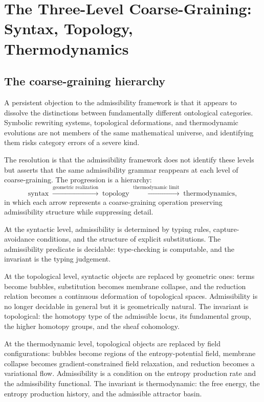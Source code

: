 \documentclass[12pt, a4paper]{article}
\theoremstyle{plain}
\theoremstyle{definition}
\theoremstyle{remark}
\begin{document}
\section{The Three-Level Coarse-Graining: Syntax, Topology,
  Thermodynamics}
\label{app:threelevel}

\subsection{The coarse-graining hierarchy}

A persistent objection to the admissibility framework is that it appears to dissolve
the distinctions between fundamentally different ontological categories. Symbolic
rewriting systems, topological deformations, and thermodynamic evolutions are not
members of the same mathematical universe, and identifying them risks category errors
of a severe kind.

The resolution is that the admissibility framework does not identify these levels but
asserts that the same admissibility grammar reappears at each level of coarse-graining.
The progression is a hierarchy:
\[
  \text{syntax} \;\xrightarrow{\text{geometric realization}}\; \text{topology}
  \;\xrightarrow{\text{thermodynamic limit}}\; \text{thermodynamics},
\]
in which each arrow represents a coarse-graining operation preserving admissibility
structure while suppressing detail.

At the syntactic level, admissibility is determined by typing rules, capture-avoidance
conditions, and the structure of explicit substitutions. The admissibility predicate
is decidable: type-checking is computable, and the invariant is the typing judgement.

At the topological level, syntactic objects are replaced by geometric ones: terms
become bubbles, substitution becomes membrane collapse, and the reduction relation
becomes a continuous deformation of topological spaces. Admissibility is no longer
decidable in general but it is geometrically natural. The invariant is topological:
the homotopy type of the admissible locus, its fundamental group, the higher homotopy
groups, and the sheaf cohomology.

At the thermodynamic level, topological objects are replaced by field configurations:
bubbles become regions of the entropy-potential field, membrane collapse becomes
gradient-constrained field relaxation, and reduction becomes a variational flow.
Admissibility is a condition on the entropy production rate and the admissibility
functional. The invariant is thermodynamic: the free energy, the entropy production
history, and the admissible attractor basin.
\end{document}
